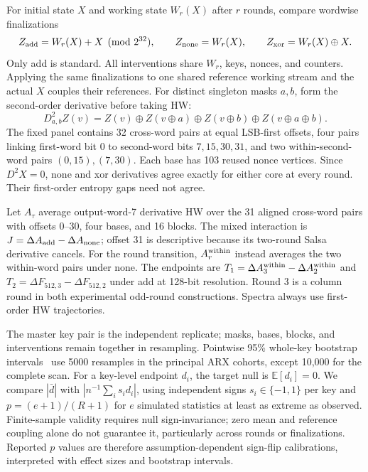 \documentclass[electronics,article,submit,pdftex,oneauthor]{Definitions/mdpi}
\begin{document}
For initial state $X$ and working state $W_r(X)$ after $r$ rounds, compare wordwise finalizations
\begin{equation}
 Z_{\rm add}=W_r(X)+X\pmod{2^{32}},\qquad
 Z_{\rm none}=W_r(X),\qquad Z_{\rm xor}=W_r(X)\oplus X.
 \label{eq:ffvariants}
\end{equation}
Only add is standard. All interventions share $W_r$, keys, nonces, and counters. Applying the same finalizations to one shared reference working stream and the actual $X$ couples their references. For distinct singleton masks $a,b$, form the second-order derivative before taking HW:
\begin{equation}
 D^2_{a,b}Z(v)=Z(v)\oplus Z(v\oplus a)\oplus Z(v\oplus b)\oplus Z(v\oplus a\oplus b).
 \label{eq:derivative}
\end{equation}
The fixed panel contains 32 cross-word pairs at equal LSB-first offsets, four pairs linking first-word bit 0 to second-word bits $7,15,30,31$, and two within-second-word pairs $(0,15),(7,30)$. Each base has 103 reused nonce vertices. Since $D^2X=0$, none and xor derivatives agree exactly for either core at every round. Their first-order entropy gaps need not agree.

Let $A_\tau$ average output-word-7 derivative HW over the 31 aligned cross-word pairs with offsets 0--30, four bases, and 16 blocks. The mixed interaction is $J=\Delta A_{\rm add}-\Delta A_{\rm none}$; offset 31 is descriptive because its two-round Salsa derivative cancels. For the round transition, $A_r^{\rm within}$ instead averages the two within-word pairs under none. The endpoints are $T_1=\Delta A_3^{\rm within}-\Delta A_2^{\rm within}$ and $T_2=\Delta F_{512,3}-\Delta F_{512,2}$ under add at 128-bit resolution. Round 3 is a column round in both experimental odd-round constructions. Spectra always use first-order HW trajectories.

The master key pair is the independent replicate; masks, bases, blocks, and interventions remain together in resampling. Pointwise 95\% whole-key bootstrap intervals~\citep{field2007} use 5000 resamples in the principal ARX cohorts, except 10,000 for the complete scan. For a key-level endpoint $d_i$, the target null is $\mathbb E[d_i]=0$. We compare $|\bar d|$ with $|n^{-1}\sum_i s_i d_i|$, using independent signs $s_i\in\{-1,1\}$ per key and $p=(e+1)/(R+1)$ for $e$ simulated statistics at least as extreme as observed. Finite-sample validity requires null sign-invariance; zero mean and reference coupling alone do not guarantee it, particularly across rounds or finalizations. Reported $p$ values are therefore assumption-dependent sign-flip calibrations, interpreted with effect sizes and bootstrap intervals.
\end{document}
